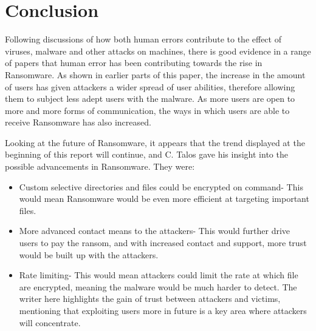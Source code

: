\documentclass[journal,comsoc]{IEEEtran}
\begin{document}
\section{Conclusion}
Following discussions of how both human errors contribute to the effect of viruses, malware and other attacks on machines, there is good evidence in a range of papers that human error has been contributing towards the rise in Ransomware. As shown in earlier parts of this paper, the increase in the amount of users has given attackers a wider spread of user abilities, therefore allowing them to subject less adept users with the malware. As more users are open to more and more forms of communication, the ways in which users are able to receive Ransomware has also increased. \par
Looking at the future of Ransomware, it appears that the trend displayed at the beginning of this report will continue, and C. Talos \cite{talos} gave his insight into the possible advancements in Ransomware. They were:
\begin{itemize}
\item Custom selective directories and files could be encrypted on command- This would mean Ransomware would be even more efficient at targeting important files.
\item More advanced contact means to the attackers- This would further drive users to pay the ransom, and with increased contact and support, more trust would be built up with the attackers.
\item Rate limiting- This would mean attackers could limit the rate at which file are encrypted, meaning the malware would be much harder to detect.
The writer here highlights the gain of trust between attackers and victims, mentioning that exploiting users more in future is a key area where attackers will concentrate. 
\end{itemize}

\ifCLASSOPTIONcaptionsoff
  \newpage
\fi
\end{document}

